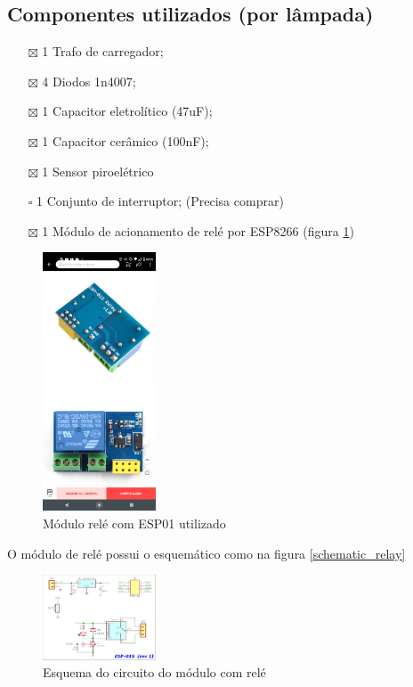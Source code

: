 \documentclass[11pt]{article}
\begin{document}
\subsection{Componentes utilizados (por lâmpada)}
\label{sec:orgee139f4}
\begin{itemize}
\item[{$\boxtimes$}] 1 Trafo de carregador;
\item[{$\boxtimes$}] 4 Diodos 1n4007;
\item[{$\boxtimes$}] 1 Capacitor eletrolítico (47uF);
\item[{$\boxtimes$}] 1 Capacitor cerâmico (100nF);
\item[{$\boxtimes$}] 1 Sensor piroelétrico
\item[{$\square$}] 1 Conjunto de interruptor; (Precisa comprar)
\item[{$\boxtimes$}] 1 Módulo de acionamento de relé por ESP8266 (figura \ref{fig:module_esp01})
\end{itemize}
\begin{figure}[h!]
\caption{\label{fig:module_esp01}Módulo relé com ESP01 utilizado}
\centering
\includegraphics[width=0.3\textwidth]{./module_esp01.png}
\end{figure}

O módulo de relé possui o esquemático como na figura \ref{schematic_relay}
\begin{figure}[h!]
\caption{\label{fig:schematic_relay}Esquema do circuito do módulo com relé}
\centering
\includegraphics[width=0.3\textwidth]{./schematic_relay.png}
\end{figure}
\end{document}
